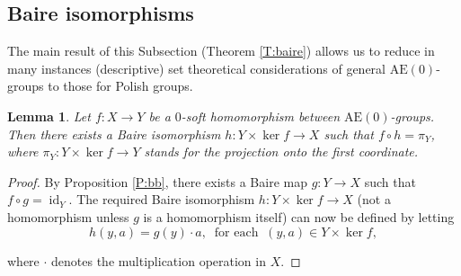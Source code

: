 \documentclass[12pt,draft]{amsart}
\theoremstyle{plain}
\newtheorem{lem}[thm]{Lemma}
\theoremstyle{definition}
\numberwithin{equation}{section}
\begin{document}

\subsection{Baire isomorphisms}\label{SS:baire}
The main result of this Subsection (Theorem \ref{T:baire}) 
allows us to reduce in many instances (descriptive) set
theoretical considerations of general $\text{AE}(0)$-groups
to those for Polish groups. 

\begin{lem}\label{L:dixmier}
Let $f \colon X \to Y$ be a $0$-soft homomorphism between
$\text{AE}(0)$-groups. Then there
exists a Baire isomorphism $h \colon Y \times \ker f \to X$ such
that $f \circ h = \pi_{Y}$, where
$\pi_{Y} \colon Y \times \ker f \to Y$ stands for the projection
onto the first coordinate.
\end{lem}
\begin{proof}
By Proposition \ref{P:bb}, there exists a Baire map
$g \colon Y \to X$ such that
$f \circ g = \operatorname{id}_{Y}$.
The required Baire isomorphism $h \colon Y \times \ker f \to X$
(not a homomorphism unless $g$
is a homomorphism itself) can now be defined by letting
\[ h(y,a) = g(y)\cdot a ,\;\;\text{for each}\;\; (y,a) \in Y \times \ker f ,\] 

\noindent where $\cdot$ denotes the multiplication operation in $X$. 
\end{proof}
\end{document}
